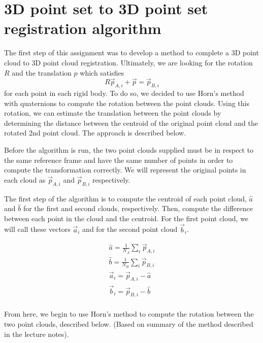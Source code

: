 \documentclass[letterpaper, 11pt]{report}
\begin{document}
\section{3D point set to 3D point set registration algorithm}
The first step of this assignment was to develop a method to complete a 3D point cloud to 3D point cloud registration. Ultimately, we are looking for the rotation $R$ and the translation $p$ which satisfies $$R\vec p_{A,i} + \vec p = \vec p_{B,i}$$ for each point in each rigid body. To do so, we decided to use Horn's method with quaternions to compute the rotation between the point clouds. Using this rotation, we can estimate the translation between the point clouds by determining the distance between the centroid of the original point cloud and the rotated 2nd point cloud. The approach is described below.

Before the algorithm is run, the two point clouds supplied must be in respect to the same reference frame and have the same number of points in order to compute the transformation correctly. We will represent the original points in each cloud as $\vec p_{A,i}$ and $\vec p_{B,i}$ respectively.

The first step of the algorithm is to compute the centroid of each point cloud, $\hat{a}$ and $\hat{b}$ for the first and second clouds, respectively. Then, compute the difference between each point in the cloud and the centroid. For the first point cloud, we will call these vectors $\vec a_i$ and for the second point cloud $\vec b_i$.

\begin{align*}
    \hat{a} = \frac{1}{N_A}\sum_i{\vec p_{A,i}} \\
    \hat{b} = \frac{1}{N_B}\sum_i{\vec p_{B,i}} \\
    \vec a_i = \vec p_{A,i} - \hat{a} \\
    \vec b_i = \vec p_{B,i} - \hat{b} \\
\end{align*}

From here, we begin to use Horn's method to compute the rotation between the two point clouds, described below. (Based on summary of the method described in the lecture notes).
\end{document}
